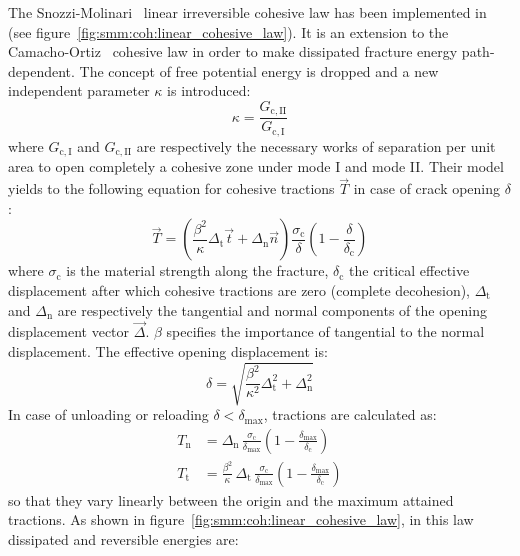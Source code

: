 The Snozzi-Molinari~\cite{snozzi_cohesive_2013} linear irreversible
cohesive law has been implemented in \akantu (see
figure~\ref{fig:smm:coh:linear_cohesive_law}). It is an extension to
the Camacho-Ortiz~\cite{camacho_computational_1996} cohesive law in
order to make dissipated fracture energy path-dependent. The concept
of free potential energy is dropped and a new independent parameter
$\kappa$ is introduced:
\begin{equation}
  \kappa = \frac{G_\mathrm{c, II}}{G_\mathrm{c, I}}
\end{equation}
where $G_\mathrm{c, I}$ and $G_\mathrm{c, II}$ are respectively the
necessary works of separation per unit area to open completely a
cohesive zone under mode I and mode II. Their model yields to the
following equation for cohesive tractions $\vec{T}$ in case of crack
opening ${\delta}$:
\begin{equation}
  \label{eq:smm:coh:tractions}
  \vec{T} = \left( \frac{\beta^2}{\kappa} \Delta_\mathrm{t} \vec{t} +
    \Delta_\mathrm{n} \vec{n} \right)
  \frac{\sigma_\mathrm{c}}{\delta}
  \left( 1- \frac{\delta}{\delta_\mathrm{c}} \right)
\end{equation}
where $\sigma_\mathrm{c}$ is the material strength along the fracture,
$\delta_\mathrm{c}$ the critical effective displacement after which
cohesive tractions are zero (complete decohesion), $\Delta_\mathrm{t}$
and $\Delta_\mathrm{n}$ are respectively the tangential and normal
components of the opening displacement vector $\vec{\Delta}$. $\beta$
specifies the importance of tangential to the normal displacement. The
effective opening displacement is:
\begin{equation}
  \delta = \sqrt{\frac{\beta^2}{\kappa^2} \Delta_\mathrm{t}^2 +
    \Delta_\mathrm{n}^2}
\end{equation}
In case of unloading or reloading $\delta < \delta_\mathrm{max}$,
tractions are calculated as:
\begin{align}
  T_\mathrm{n} &= \Delta_\mathrm{n}\,
  \frac{\sigma_\mathrm{c}}{\delta_\mathrm{max}}
  \left( 1- \frac{\delta_\mathrm{max}}{\delta_\mathrm{c}} \right) \\
  T_\mathrm{t} &= \frac{\beta^2}{\kappa}\, \Delta_\mathrm{t}\,
  \frac{\sigma_\mathrm{c}}{\delta_\mathrm{max}}
  \left( 1- \frac{\delta_\mathrm{max}}{\delta_\mathrm{c}} \right)
\end{align}
so that they vary linearly between the origin and the maximum attained
tractions. As shown in figure~\ref{fig:smm:coh:linear_cohesive_law},
in this law dissipated and reversible energies are:
